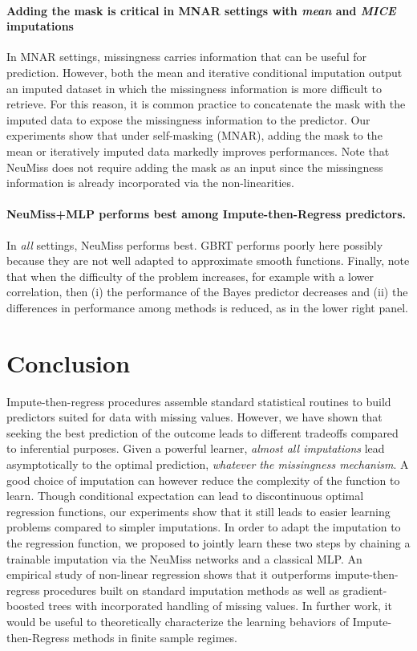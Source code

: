 \documentclass{article}
\theoremstyle{plain}
\begin{document}
\paragraph{Adding the mask is critical in MNAR settings with \emph{mean} and \emph{MICE} imputations} In MNAR settings, missingness carries information that can be useful for prediction. However, both the mean and iterative conditional imputation output an imputed dataset in which the missingness information is more difficult to retrieve. For this reason, it is common practice to concatenate the mask with the imputed data to expose the missingness information to the predictor. Our experiments show that under self-masking (MNAR), adding the mask to the mean or iteratively imputed data markedly improves performances. Note that NeuMiss does not require adding the mask as an input since the missingness information is already incorporated via the non-linearities.

\paragraph{NeuMiss+MLP performs best among Impute-then-Regress predictors.} In \emph{all}
settings, NeuMiss performs best. GBRT performs poorly here possibly because they are not well adapted to approximate smooth functions. Finally, note that when the difficulty of the problem increases, for example with a lower correlation, then (i) the performance of the Bayes predictor decreases and (ii) the differences in performance among methods is reduced, as in the lower right panel.


\section{Conclusion}

Impute-then-regress procedures assemble standard statistical routines to build predictors suited for data with missing values. However, we have shown that seeking the best prediction of the outcome leads to different tradeoffs compared to inferential purposes. Given a powerful learner, \emph{almost all imputations} lead asymptotically to the optimal prediction, \emph{whatever the missingness mechanism}. A good choice of imputation can however reduce the complexity of the function to learn.
Though conditional expectation can lead to discontinuous optimal regression functions, our experiments show that it still leads to easier learning problems compared to simpler imputations. 
In order to  adapt the imputation to the regression function, we proposed to jointly learn these two steps by chaining a trainable imputation via the NeuMiss networks and a classical MLP. An empirical study of non-linear regression shows that it outperforms impute-then-regress procedures built on standard imputation methods as well as gradient-boosted trees with incorporated handling of missing values. In further work, it would be useful to theoretically characterize the learning behaviors of Impute-then-Regress methods in finite sample regimes. 
\end{document}
